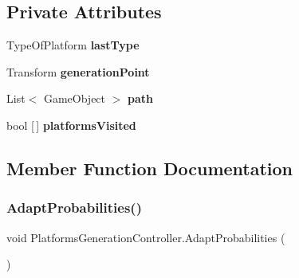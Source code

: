 \subsection*{Private Attributes}
\begin{DoxyCompactItemize}
\item 
\mbox{\label{class_platforms_generation_controller_affd1b136c7e0b233ac62bca608eaabec}} 
Type\+Of\+Platform {\bfseries last\+Type}
\item 
\mbox{\label{class_platforms_generation_controller_a2220e12411719bfd53c82358271a170c}} 
Transform {\bfseries generation\+Point}
\item 
\mbox{\label{class_platforms_generation_controller_abd2fd87ca78d8ab707f324dede6081e9}} 
List$<$ Game\+Object $>$ {\bfseries path}
\item 
\mbox{\label{class_platforms_generation_controller_af9ef24bce15b0cc2d3ecabff5bf7d6e1}} 
bool \mbox{[}$\,$\mbox{]} {\bfseries platforms\+Visited}
\end{DoxyCompactItemize}


\subsection{Member Function Documentation}
\mbox{\label{class_platforms_generation_controller_ab45ad4c42b43ad7eebc92ac79d4ddb51}} 
\subsubsection{\texorpdfstring{Adapt\+Probabilities()}{AdaptProbabilities()}}
{\footnotesize\ttfamily void Platforms\+Generation\+Controller.\+Adapt\+Probabilities (\begin{DoxyParamCaption}{ }\end{DoxyParamCaption})\hspace{0.3cm}{\ttfamily [protected]}}

